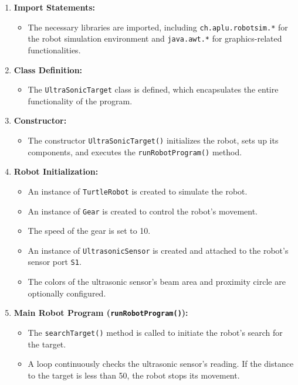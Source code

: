 \begin{enumerate}
  \item \textbf{Import Statements:}
  \begin{itemize}
    \item The necessary libraries are imported, including \texttt{ch.aplu.robotsim.*} for the robot simulation environment and \texttt{java.awt.*} for graphics-related functionalities.
  \end{itemize}
  
  \item \textbf{Class Definition:}
  \begin{itemize}
    \item The \texttt{UltraSonicTarget} class is defined, which encapsulates the entire functionality of the program.
  \end{itemize}
  
  \item \textbf{Constructor:}
  \begin{itemize}
    \item The constructor \texttt{UltraSonicTarget()} initializes the robot, sets up its components, and executes the \texttt{runRobotProgram()} method.
  \end{itemize}
  
  \item \textbf{Robot Initialization:}
  \begin{itemize}
    \item An instance of \texttt{TurtleRobot} is created to simulate the robot.
    \item An instance of \texttt{Gear} is created to control the robot's movement.
    \item The speed of the gear is set to 10.
    \item An instance of \texttt{UltrasonicSensor} is created and attached to the robot's sensor port \texttt{S1}.
    \item The colors of the ultrasonic sensor's beam area and proximity circle are optionally configured.
  \end{itemize}
  
  \item \textbf{Main Robot Program (\texttt{runRobotProgram()}):}
  \begin{itemize}
    \item The \texttt{searchTarget()} method is called to initiate the robot's search for the target.
    \item A loop continuously checks the ultrasonic sensor's reading. If the distance to the target is less than 50, the robot stops its movement.
  \end{itemize}
  

\end{enumerate}
